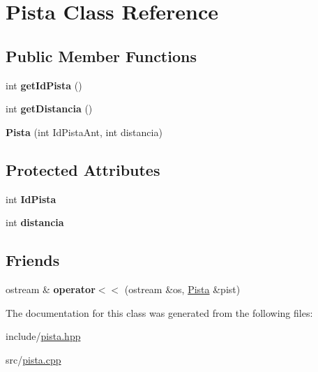 \hypertarget{classPista}{}\section{Pista Class Reference}
\label{classPista}
\subsection*{Public Member Functions}
\begin{DoxyCompactItemize}
\item 
\mbox{\label{classPista_aadec00f0cc978215f815678d116ab4e1}} 
int {\bfseries get\+Id\+Pista} ()
\item 
\mbox{\label{classPista_ac0600ef25b5e73b5b21e465dbd8f02e2}} 
int {\bfseries get\+Distancia} ()
\item 
\mbox{\label{classPista_a25515925305dfbea17dede3b89963d2d}} 
{\bfseries Pista} (int Id\+Pista\+Ant, int distancia)
\end{DoxyCompactItemize}
\subsection*{Protected Attributes}
\begin{DoxyCompactItemize}
\item 
\mbox{\label{classPista_a4bfa7467d6b226478f8d5fbcd19696a9}} 
int {\bfseries Id\+Pista}
\item 
\mbox{\label{classPista_a3c8a346470e8660b4a91a2eb6730e2c6}} 
int {\bfseries distancia}
\end{DoxyCompactItemize}
\subsection*{Friends}
\begin{DoxyCompactItemize}
\item 
\mbox{\label{classPista_a0e16c20ff43094a1e1c426a6bc377313}} 
ostream \& {\bfseries operator$<$$<$} (ostream \&os, \hyperlink{classPista}{Pista} \&pist)
\end{DoxyCompactItemize}


The documentation for this class was generated from the following files\+:\begin{DoxyCompactItemize}
\item 
include/\hyperlink{pista_8hpp}{pista.\+hpp}\item 
src/\hyperlink{pista_8cpp}{pista.\+cpp}\end{DoxyCompactItemize}
